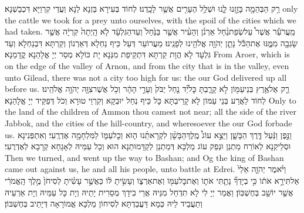 {רַ֥ק הַבְּהֵמָ֖ה בָּזַ֣זְנוּ לָ֑נוּ וּשְׁלַ֥ל הֶעָרִ֖ים אֲשֶׁ֥ר לָכָֽדְנוּ׃}
{לְחוֹד בְּעִירָא בַּזְנָא לַנָא וַעֲדַי קִרְוַיָּא דִּכְבַשְׁנָא׃}
{only the cattle we took for a prey unto ourselves, with the spoil of the cities which we had taken.}{}
{מֵֽעֲרֹעֵ֡ר אֲשֶׁר֩ עַל\maqqaf שְׂפַת\maqqaf נַ֨חַל אַרְנֹ֜ן וְהָעִ֨יר אֲשֶׁ֤ר בַּנַּ֙חַל֙ וְעַד\maqqaf הַגִּלְעָ֔ד לֹ֤א הָֽיְתָה֙ קִרְיָ֔ה אֲשֶׁ֥ר שָׂגְבָ֖ה מִמֶּ֑נּוּ אֶת\maqqaf הַכֹּ֕ל נָתַ֛ן יְהֹוָ֥ה אֱלֹהֵ֖ינוּ לְפָנֵֽינוּ׃}
{מֵעֲרוֹעֵר דְּעַל כֵּיף נַחְלָא דְּאַרְנוֹן וְקַרְתָּא דִּבְנַחְלָא וְעַד גִּלְעָד לָא הֲוָת קַרְתָּא דִּתְקֵיפַת מִנַּנָא יָת כּוֹלָא מְסַר יְיָ אֱלָהַנָא קֳדָמַנָא׃}
{From Aroer, which is on the edge of the valley of Arnon, and from the city that is in the valley, even unto Gilead, there was not a city too high for us: the \lord\space our God delivered up all before us.}{}
{רַ֛ק אֶל\maqqaf אֶ֥רֶץ בְּנֵי\maqqaf עַמּ֖וֹן לֹ֣א קָרָ֑בְתָּ כׇּל\maqqaf יַ֞ד נַ֤חַל יַבֹּק֙ וְעָרֵ֣י הָהָ֔ר וְכֹ֥ל אֲשֶׁר\maqqaf צִוָּ֖ה יְהֹוָ֥ה אֱלֹהֵֽינוּ׃}
{לְחוֹד לַאֲרַע בְּנֵי עַמּוֹן לָא קָרֵיבְתָּא כָּל כֵּיף נְחַל יוּבְקָא וְקִרְוֵי טוּרָא וְכֹל דְּפַקֵּיד יְיָ אֱלָהַנָא׃}
{Only to the land of the children of Ammon thou camest not near; all the side of the river Jabbok, and the cities of the hill-country, and wheresoever the \lord\space our God forbade us.}{}
\newperek
{}%
{וַנֵּ֣פֶן וַנַּ֔עַל דֶּ֖רֶךְ הַבָּשָׁ֑ן וַיֵּצֵ֣א עוֹג֩ מֶֽלֶךְ\maqqaf הַבָּשָׁ֨ן לִקְרָאתֵ֜נוּ ה֧וּא וְכׇל\maqqaf עַמּ֛וֹ לַמִּלְחָמָ֖ה אֶדְרֶֽעִי׃}
{וְאִתְפְּנִינָא וּסְלֵיקְנָא לְאוֹרַח מַתְנַן וּנְפַק עוֹג מַלְכָּא דְּמַתְנַן לְקַדָּמוּתַנָא הוּא וְכָל עַמֵּיהּ לְאָגָחָא קְרָבָא לְאֶדְרֶעִי׃}
{Then we turned, and went up the way to Bashan; and Og the king of Bashan came out against us, he and all his people, unto battle at Edrei.}{}
{וַיֹּ֨אמֶר יְהֹוָ֤ה אֵלַי֙ אַל\maqqaf תִּירָ֣א אֹת֔וֹ כִּ֣י בְיָדְךָ֞ נָתַ֧תִּי אֹת֛וֹ וְאֶת\maqqaf כׇּל\maqqaf עַמּ֖וֹ וְאֶת\maqqaf אַרְצ֑וֹ וְעָשִׂ֣יתָ לּ֔וֹ כַּאֲשֶׁ֣ר עָשִׂ֗יתָ לְסִיחֹן֙ מֶ֣לֶךְ הָֽאֱמֹרִ֔י אֲשֶׁ֥ר יוֹשֵׁ֖ב בְּחֶשְׁבּֽוֹן׃}
{וַאֲמַר יְיָ לִי לָא תִדְחַל מִנֵּיהּ אֲרֵי בִידָךְ מְסַרִית יָתֵיהּ וְיָת כָּל עַמֵּיהּ וְיָת אַרְעֵיהּ וְתַעֲבֵיד לֵיהּ כְּמָא דַּעֲבַדְתָּא לְסִיחוֹן מַלְכָּא אֱמוֹרָאָה דְּיָתֵיב בְּחֶשְׁבּוֹן׃}
